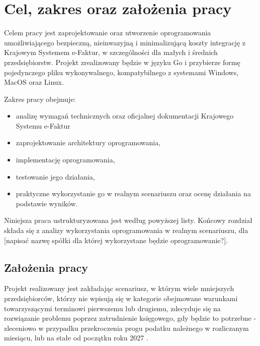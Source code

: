 \section{Cel, zakres oraz założenia pracy}
Celem pracy jest zaprojektowanie oraz utworzenie oprogramowania umożliwiającego bezpieczną, nieinwazyjną i minimalizującą koszty integrację z Krajowym Systemem e-Faktur, w szczególności dla małych i średnich przedsiębiorstw. Projekt zrealizowany będzie w języku Go i przybierze formę pojedynczego pliku wykonywalnego, kompatybilnego z systemami Windows, MacOS oraz Linux. 
\par
Zakres pracy obejmuje:
\begin{itemize}
    \item analizę wymagań technicznych oraz oficjalnej dokumentacji Krajowego Systemu e-Faktur
    \item zaprojektowanie architektury oprogramowania,
    \item implementację oprogramowania,
    \item testowanie jego działania,
    \item praktyczne wykorzystanie go w realnym scenariuszu oraz ocenę działania na podstawie wyników.
\end{itemize}

Niniejsza praca ustrukturyzowana jest według powyższej listy. Końcowy rozdział składa się z analizy wykorzystania oprogramowania w realnym scenariuszu, dla [napisać nazwę spółki dla której wykorzystane będzie oprogramowanie?]. 

\subsection{Założenia pracy}
Projekt realizowany jest zakładając scenariusz, w którym wiele mniejszych przedsiębiorców, którzy nie wpisują się w kategorie obejmowane warunkami towarzyszącymi terminowi pierwszemu lub drugiemu, zdecyduje się na rozwiązanie problemu poprzez zatrudnienie księgowego, gdy będzie to potrzebne - zleceniowo w przypadku przekroczenia progu podatku należnego w rozliczanym miesiącu, lub na stałe od początku roku 2027 \parencite{ministerstwo_finansow_zakres_2025}. 

